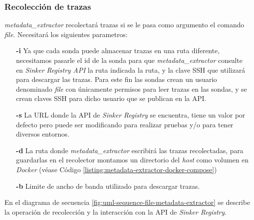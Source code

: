 

\subsubsection{Recolección de trazas}

\emph{metadata\_extractor} recolectará trazas si se le pasa como argumento el comando \emph{file}. Necesitará los siguientes
parametros:

\begin{itemize}
    \item[\textbf{-i}] Ya que cada sonda puede almacenar trazas en una ruta diferente, necesitamos pasarle el 
                       id de la sonda para que \emph{metadata\_extractor} consulte en \emph{Sinker Registry API}
                       la ruta indicada la ruta, y la clave SSH que utilizará para descargar las trazas. Para este fin
                       las sondas crean un usuario denominado \emph{file} con únicamente permisos para leer trazas en las sondas, y
                       se crean claves SSH para dicho usuario que se publican en la API.
    \item[\textbf{-s}] La URL donde la API de \emph{Sinker Registry} se encuentra, tiene un valor por defecto pero puede ser modificando
                       para realizar pruebas y/o para tener diversos entornos.
    \item[\textbf{-d}] La ruta donde \emph{metadata\_extractor} escribirá las trazas recolectadas, para guardarlas en el recolector
                       montamos un directorio del \emph{host} como volumen en \emph{Docker} (véase Código \ref{listing:metadata-extractor-docker-compose})
    \item[\textbf{-b}] Limite de ancho de banda utilizado para descargar trazas.
\end{itemize}

En el diagrama de secuencia \ref{fig:uml-sequence-file-metadata-extractor} se describe la operación de recolección y la interacción con la API de \emph{Sinker Registry}.

